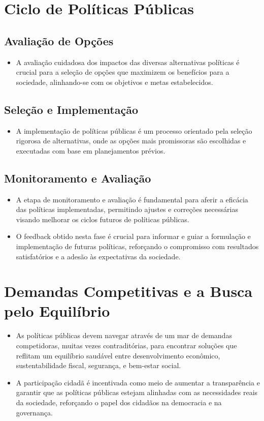 \documentclass[
   article,       
   12pt,          
   oneside,       
   a4paper,       
   english,       
   brazil,        
   sumario=tradicional
   ]{abntex2}
\begin{document}
\section{Ciclo de Políticas Públicas}
\subsection{Avaliação de Opções}
\begin{itemize}
\item A avaliação cuidadosa dos impactos das diversas alternativas políticas é crucial para a seleção de opções que maximizem os benefícios para a sociedade, alinhando-se com os objetivos e metas estabelecidos.
\end{itemize}
\subsection{Seleção e Implementação}
\begin{itemize}
\item A implementação de políticas públicas é um processo orientado pela seleção rigorosa de alternativas, onde as opções mais promissoras são escolhidas e executadas com base em planejamentos prévios.
\end{itemize}
\subsection{Monitoramento e Avaliação}
\begin{itemize}
\item A etapa de monitoramento e avaliação é fundamental para aferir a eficácia das políticas implementadas, permitindo ajustes e correções necessárias visando melhorar os ciclos futuros de políticas públicas.
\item O feedback obtido nesta fase é crucial para informar e guiar a formulação e implementação de futuras políticas, reforçando o compromisso com resultados satisfatórios e a adesão às expectativas da sociedade.
\end{itemize}

\section{Demandas Competitivas e a Busca pelo Equilíbrio}
\begin{itemize}
\item As políticas públicas devem navegar através de um mar de demandas competidoras, muitas vezes contraditórias, para encontrar soluções que reflitam um equilíbrio saudável entre desenvolvimento econômico, sustentabilidade fiscal, segurança, e bem-estar social.
\item A participação cidadã é incentivada como meio de aumentar a transparência e garantir que as políticas públicas estejam alinhadas com as necessidades reais da sociedade, reforçando o papel dos cidadãos na democracia e na governança.
\end{itemize}
\end{document}
